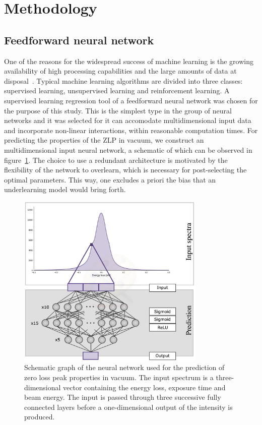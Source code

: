 \section{Methodology}
\label{sec:methodology}

\subsection{Feedforward neural network}

One of the reasons for the widespread success of machine learning 
is the growing availability of high processing capabilities 
and the large amounts of data at disposal~\cite{LeCun:2015}.
%
Typical machine learning algorithms are divided into three classes:
supervised learning, unsupervised learning and reinforcement learning.
%
A supervised learning regression tool of a feedforward neural network 
was chosen for the purpose of this study. This is the simplest type 
in the group of neural networks and it was selected for it can accomodate 
multidimensional input data and 
incorporate non-linear interactions, within reasonable computation times. 
%
For predicting the properties of the ZLP in vacuum, we construct an multidimensional
input neural network, a schematic of which can be observed in figure~\ref{fig:architecture}.
The choice to use a redundant architecture is motivated by the flexibility of the network 
to overlearn, which is necessary for post-selecting the optimal parameters.
This way, one excludes a priori the bias that an underlearning model would bring forth. 

\begin{figure}[h]
    \centering
    \includegraphics[width=90mm]{plots/architecture.jpg}
    \caption{Schematic graph of the neural network used for the prediction of zero loss peak properties in vacuum. The input spectrum is a three-dimensional vector containing the energy loss, exposure time and beam energy. The input is passed through three successive fully connected layers before a one-dimensional output of the intensity is produced.}
    \label{fig:architecture}
\end{figure}

